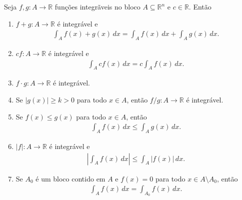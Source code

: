 \begin{theorem}[Propriedades]
  Seja $f,g:A\to\mathbb{R}$ funções integrãveis no bloco $A\subseteq\mathbb{R}^{n}$ e $c\in\mathbb{R}$. Então
  \begin{enumerate}
    \item $f+g:A\to\mathbb{R}$ é integrável e
      \begin{align*}
        \int_{A}f(x)+g(x)\,dx=\int_{A}f(x)\,dx+\int_{A}g(x)\,dx.
      \end{align*}
    \item $cf:A\to\mathbb{R}$ é integrável e
      \begin{align*}
        \int_{A}cf(x)\,dx=c \int_{A}f(x)\,dx.
      \end{align*}
    \item $f\cdot g:A\to\mathbb{R}$ é integrável.
    \item Se $|g(x)|\geq k>0$ para todo $x\in A$, então $f/g:A\to\mathbb{R}$ é integrável.
    \item Se $f(x)\leq g(x)$ para todo $x\in A$, então 
      \begin{align*}
        \int_{A}f(x)\,dx\leq \int_{A}g(x)\,dx.
      \end{align*}
    \item $|f|:A\to\mathbb{R}$ é integrável e
      \begin{align*}
        \left| \int_{A}f(x)\,dx \right|\leq \int_{A}|f(x)|\,dx.
      \end{align*}
    \item Se $A_0$ é um bloco contido em $A$ e $f(x)=0$ para todo $x\in A\setminus A_0$, então
      \begin{align*}
        \int_{A}f(x)\,dx=\int_{A_0}f(x)\,dx.
      \end{align*}
  \end{enumerate}
\end{theorem}
